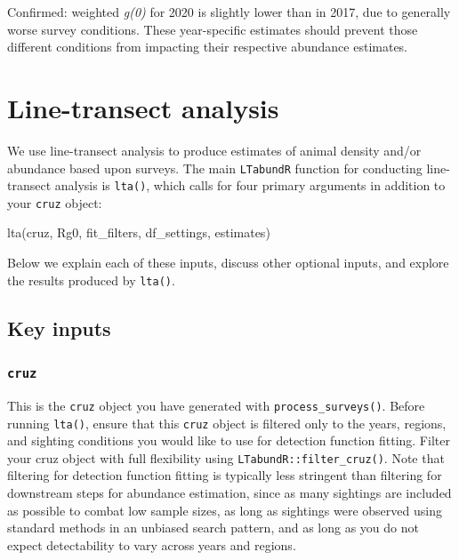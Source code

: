 \documentclass[
]{book}
\newenvironment{Shaded}{\begin{snugshade}}{\end{snugshade}}
\newcommand{\FunctionTok}[1]{\textcolor[rgb]{0.00,0.00,0.00}{#1}}
\newcommand{\NormalTok}[1]{#1}
\begin{document}
Confirmed: weighted \emph{g(0)} for 2020 is slightly lower than in 2017, due to generally worse survey conditions. These year-specific estimates should prevent those different conditions from impacting their respective abundance estimates.

\hypertarget{lta}{%
\chapter{Line-transect analysis}\label{lta}}

We use line-transect analysis to produce estimates of animal density and/or abundance based upon surveys. The main \texttt{LTabundR} function for conducting line-transect analysis is \texttt{lta()}, which calls for four primary arguments in addition to your \texttt{cruz} object:

\begin{Shaded}
\begin{Highlighting}[]
\FunctionTok{lta}\NormalTok{(cruz,}
\NormalTok{    Rg0,}
\NormalTok{    fit\_filters,}
\NormalTok{    df\_settings,}
\NormalTok{    estimates)}
\end{Highlighting}
\end{Shaded}

Below we explain each of these inputs, discuss other optional inputs, and explore the results produced by \texttt{lta()}.

\hypertarget{key-inputs}{%
\section*{Key inputs}\label{key-inputs}}

\hypertarget{cruz}{%
\subsection*{\texorpdfstring{\texttt{cruz}}{cruz}}\label{cruz}}

This is the \texttt{cruz} object you have generated with \texttt{process\_surveys()}. Before running \texttt{lta()}, ensure that this \texttt{cruz} object is filtered only to the years, regions, and sighting conditions you would like to use for detection function fitting. Filter your cruz object with full flexibility using \texttt{LTabundR::filter\_cruz()}. Note that filtering for detection function fitting is typically less stringent than filtering for downstream steps for abundance estimation, since as many sightings are included as possible to combat low sample sizes, as long as sightings were observed using standard methods in an unbiased search pattern, and as long as you do not expect detectability to vary across years and regions.
\end{document}
